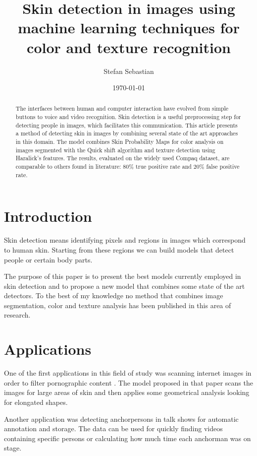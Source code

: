 \documentclass[12pt]{article}
\begin{document}
	\title{Skin detection in images using machine learning techniques for color and texture recognition}
	\author{Stefan Sebastian}
	\date{\today}
	\maketitle
	
	\begin{abstract}
		The interfaces between human and computer interaction have evolved from simple buttons to voice and video recognition. Skin detection is a useful preprocessing step for detecting people in images, which facilitates this communication. This article presents a method of detecting skin in images by combining several state of the art approaches in this domain. The model combines Skin Probability Maps for color analysis on images segmented with the Quick shift algorithm and texture detection using Haralick's features. The results, evaluated on the widely used Compaq dataset, are comparable to others found in literature: 80\% true positive rate and 20\% false positive rate.
	\end{abstract}
	
	\newpage
	\tableofcontents
	\newpage
	
	\section{Introduction}
	Skin detection means identifying pixels and regions in images which correspond to human skin. Starting from these regions we can build models that detect people or certain body parts.
	
	The purpose of this paper is to present the best models currently employed in skin detection and to propose a new model that combines some state of the art detectors. To the best of my knowledge no method that combines image segmentation, color and texture analysis has been published in this area of research.
	
	\section{Applications}
	One of the first applications in this field of study was scanning internet images in order to filter pornographic content \cite{finding_naked_people}. The model proposed in that paper scans the images for large areas of skin and then applies some geometrical analysis looking for elongated shapes.
	
	Another application was detecting anchorpersons in talk shows \cite{anchor_person_detection} for automatic annotation and storage. The data can be used for quickly finding videos containing specific persons or calculating how much time each anchorman was on stage.
	
\end{document}

